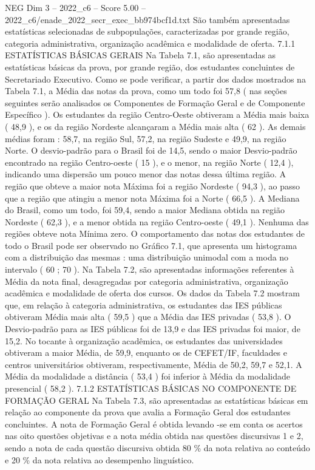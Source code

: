 \begin{textsample}{NEG Dim 3 – 2022\_c6 – Score 5.00 – 2022\_c6/enade\_2022\_secr\_exec\_bb974bcf1d.txt}
São também apresentadas estatísticas selecionadas de subpopulações, caracterizadas por grande região, categoria administrativa, organização acadêmica e modalidade de oferta. 7.1.1 ESTATÍSTICAS BÁSICAS GERAIS Na Tabela 7.1, são apresentadas as estatísticas básicas da prova, por grande região, dos estudantes concluintes de Secretariado Executivo.
Como se pode verificar, a partir dos dados mostrados na Tabela 7.1, a Média das notas da prova, como um todo foi 57,8 ( nas seções seguintes serão analisados os Componentes de Formação Geral e de Componente Específico ).
Os estudantes da região Centro-Oeste obtiveram a Média mais baixa ( 48,9 ), e os da região Nordeste alcançaram a Média mais alta ( 62 ).
As demais médias foram : 58,7, na região Sul, 57,2, na região Sudeste e 49,9, na região Norte.
O desvio-padrão para o Brasil foi de 14,5, sendo o maior Desvio-padrão encontrado na região Centro-oeste ( 15 ), e o menor, na região Norte ( 12,4 ), indicando uma dispersão um pouco menor das notas dessa última região.
A região que obteve a maior nota Máxima foi a região Nordeste ( 94,3 ), ao passo que a região que atingiu a menor nota Máxima foi a Norte ( 66,5 ).
A Mediana do Brasil, como um todo, foi 59,4, sendo a maior Mediana obtida na região Nordeste ( 62,3 ), e a menor obtida na região Centro-oeste ( 49,1 ).
Nenhuma das regiões obteve nota Mínima zero.
O comportamento das notas dos estudantes de todo o Brasil pode ser observado no Gráfico 7.1, que apresenta um histograma com a distribuição das mesmas : uma distribuição unimodal com a moda no intervalo ( 60 ; 70 ).
Na Tabela 7.2, são apresentadas informações referentes à Média da nota final, desagregadas por categoria administrativa, organização acadêmica e modalidade de oferta dos cursos.
Os dados da Tabela 7.2 mostram que, em relação à categoria administrativa, os estudantes das IES públicas obtiveram Média mais alta ( 59,5 ) que a Média das IES privadas ( 53,8 ).
O Desvio-padrão para as IES públicas foi de 13,9 e das IES privadas foi maior, de 15,2.
No tocante à organização acadêmica, os estudantes das universidades obtiveram a maior Média, de 59,9, enquanto os de CEFET/IF, faculdades e centros universitários obtiveram, respectivamente, Média de 50,2, 59,7 e 52,1.
A Média da modalidade a distância ( 53,4 ) foi inferior à Média da modalidade presencial ( 58,2 ). 7.1.2 ESTATÍSTICAS BÁSICAS NO COMPONENTE DE FORMAÇÃO GERAL Na Tabela 7.3, são apresentadas as estatísticas básicas em relação ao componente da prova que avalia a Formação Geral dos estudantes concluintes.
A nota de Formação Geral é obtida levando -se em conta os acertos nas oito questões objetivas e a nota média obtida nas questões discursivas 1 e 2, sendo a nota de cada questão discursiva obtida 80 \% da nota relativa ao conteúdo e 20 \% da nota relativa ao desempenho linguístico.

\end{textsample}
